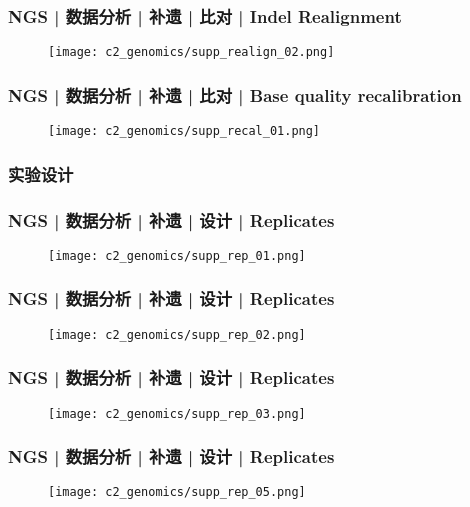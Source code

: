 \begin{frame}
  \frametitle{NGS | 数据分析 | 补遗 | 比对 | Indel Realignment}
  \begin{figure}
    \centering
    \texttt{[image: c2\_genomics/supp\_realign\_02.png]}
  \end{figure}
\end{frame}

\begin{frame}
  \frametitle{NGS | 数据分析 | 补遗 | 比对 | Base quality recalibration}
  \begin{figure}
    \centering
    \texttt{[image: c2\_genomics/supp\_recal\_01.png]}
  \end{figure}
\end{frame}

\subsubsection{实验设计}
\begin{frame}
  \frametitle{NGS | 数据分析 | 补遗 | 设计 | Replicates}
  \begin{figure}
    \centering
    \texttt{[image: c2\_genomics/supp\_rep\_01.png]}
  \end{figure}
\end{frame}

\begin{frame}
  \frametitle{NGS | 数据分析 | 补遗 | 设计 | Replicates}
  \begin{figure}
    \centering
    \texttt{[image: c2\_genomics/supp\_rep\_02.png]}
  \end{figure}
\end{frame}

\begin{frame}
  \frametitle{NGS | 数据分析 | 补遗 | 设计 | Replicates}
  \begin{figure}
    \centering
    \texttt{[image: c2\_genomics/supp\_rep\_03.png]}
  \end{figure}
\end{frame}

\begin{frame}
  \frametitle{NGS | 数据分析 | 补遗 | 设计 | Replicates}
  \begin{figure}
    \centering
    \texttt{[image: c2\_genomics/supp\_rep\_05.png]}
  \end{figure}
\end{frame}

